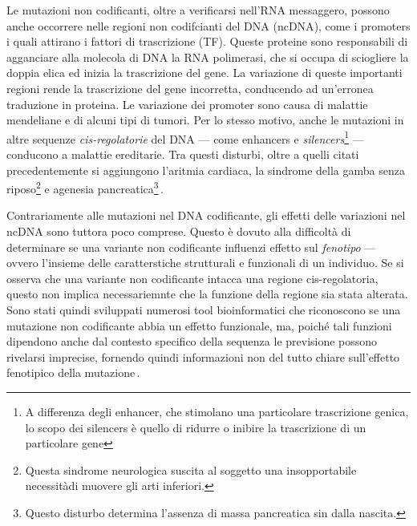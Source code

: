 Le mutazioni non codificanti, oltre a verificarsi nell'\acs{RNA} messaggero, possono anche occorrere nelle regioni non codifcianti del \acs{DNA} (\acs{ncDNA}), come i promoters i quali attirano i fattori di trascrizione (\acs{TF}). Queste proteine sono responsabili di agganciare alla molecola di \acs{DNA} la \acs{RNA} polimerasi, che si occupa di sciogliere la doppia elica ed inizia la trascrizione del gene. La variazione di queste importanti regioni rende la trascrizione del gene incorretta, conducendo ad un'erronea traduzione in proteina. Le variazione dei promoter sono causa di malattie mendeliane e di alcuni tipi di tumori. Per lo stesso motivo, anche le mutazioni in altre sequenze \textsl{cis-regolatorie} del \acs{DNA} — come enhancers e \textit{silencers}\footnote{A differenza degli enhancer, che stimolano una particolare trascrizione genica, lo scopo dei silencers è quello di ridurre o inibire la trascrizione di un particolare gene} — conducono a malattie ereditarie. Tra questi disturbi, oltre a quelli citati precedentemente si aggiungono l'aritmia cardiaca, la sindrome della gamba senza riposo\footnote{Questa sindrome neurologica suscita al soggetto una insopportabile necessitàdi muovere gli arti inferiori.} e agenesia pancreatica\footnote{Questo disturbo determina l'assenza di massa pancreatica sin dalla nascita.}\,\cite{zhang2015non, french2020role, pagni2022non, khurana2016role}.

Contrariamente alle mutazioni nel \acs{DNA} codificante, gli effetti delle variazioni nel \acs{ncDNA} sono tuttora poco comprese. Questo è dovuto alla difficoltà di determinare se una variante non codificante influenzi effetto sul \textsl{fenotipo} — ovvero l'insieme delle caratterstiche strutturali e funzionali di un individuo. Se si osserva che una variante non codificante intacca una regione cis-regolatoria, questo non implica necessariemnte che la funzione della regione sia stata alterata. Sono stati quindi sviluppati numerosi tool bioinformatici che riconoscono se una mutazione non codificante abbia un effetto funzionale, ma, poiché tali funzioni dipendono anche dal contesto specifico della sequenza le previsione possono rivelarsi imprecise, fornendo quindi informazioni non del tutto chiare sull'effetto fenotipico della mutazione\,\cite{schipper2022demystifying}. 







